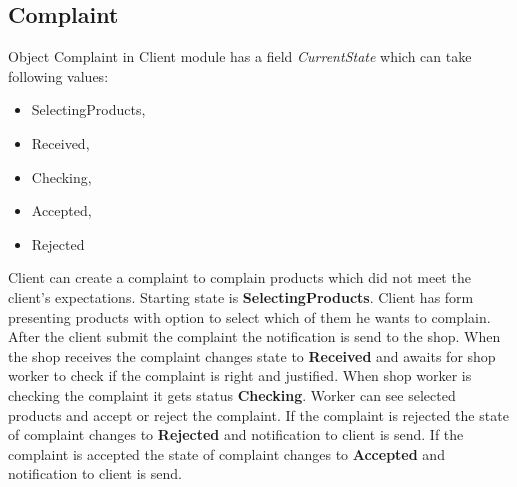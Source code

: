 \documentclass[../main.tex]{subfiles}
\begin{document}
\subsection{Complaint}
\vspace{5mm}

Object Complaint in Client module has a field \textit{CurrentState} which can take following values:

\begin{itemize}
\item SelectingProducts,
\item Received,
\item Checking,
\item Accepted,
\item Rejected
\end{itemize}

Client can create a complaint to complain products which did not meet the client's expectations. Starting state is \textbf{SelectingProducts}. Client has form presenting products with option to select which of them he wants to complain. After the client submit the complaint the notification is send to the shop. When the shop receives the complaint changes state to \textbf{Received} and awaits for shop worker to check if the complaint is right and justified. When shop worker is checking the complaint it gets status \textbf{Checking}. Worker can see selected products and accept or reject the complaint. If the complaint is rejected the state of complaint changes to \textbf{Rejected} and notification to client is send. If the complaint is accepted the state of complaint changes to \textbf{Accepted} and notification to client is send. 
\end{document}
